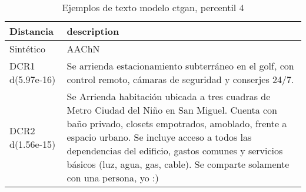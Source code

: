 \begin{table}[H]
\centering
\fontsize{10}{14}\selectfont
\caption{Ejemplos de texto modelo ctgan, percentil 4}
\label{table-example-economicos-b-1-ctgan-4p-text}
\begin{tabular}{|l|m{35em}|}
\hline
\rowcolor[gray]{0.8}
Distancia & description \\
\hline Sintético & AAChN \\
\hline DCR1 d(5.97e-16) & Se arrienda estacionamiento subterr\'aneo en el golf, con control remoto, c\'amaras de seguridad y conserjes 24/7. \\
\hline DCR2 d(1.56e-15) & Se Arrienda habitaci\'on ubicada a tres cuadras de Metro Ciudad del Ni\~no en San Miguel. Cuenta con ba\~no privado,  closets empotrados, amoblado, frente a espacio urbano. Se incluye acceso a todos las dependencias del edificio, gastos comunes y servicios b\'asicos (luz, agua, gas, cable). Se comparte solamente con una persona, yo :) \\
\hline
\end{tabular}
\end{table}
